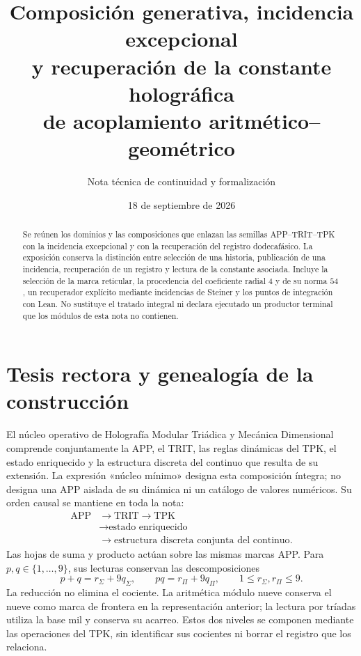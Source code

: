 \documentclass[11pt,a4paper]{article}
\title{Composición generativa, incidencia excepcional\protect\\
y recuperación de la constante holográfica\protect\\
de acoplamiento aritmético--geométrico}
\author{Nota técnica de continuidad y formalización}
\date{18 de septiembre de 2026}
\begin{document}
\maketitle

\begin{abstract}
Se reúnen los dominios y las composiciones que enlazan las semillas
APP--TRIT--TPK con la incidencia excepcional y con la recuperación del registro
dodecafásico. La exposición conserva la distinción entre selección de una
historia, publicación de una incidencia, recuperación de un registro y lectura
de la constante asociada. Incluye la selección de la marca reticular, la
procedencia del coeficiente radial $4$ y de su norma $54$, un recuperador
explícito mediante incidencias de Steiner y los puntos de integración con
Lean. No sustituye el tratado integral ni declara ejecutado un productor
terminal que los módulos de esta nota no contienen.
\end{abstract}

\section{Tesis rectora y genealogía de la construcción}

El núcleo operativo de Holografía Modular Triádica y Mecánica Dimensional
comprende conjuntamente la APP, el TRIT, las reglas dinámicas del TPK, el
estado enriquecido y la estructura discreta del continuo que resulta de su
extensión. La expresión «núcleo mínimo» designa esta composición íntegra;
no designa una APP aislada de su dinámica ni un catálogo de valores
numéricos. Su orden causal se mantiene en toda la nota:
\[
\begin{aligned}
 \mathrm{APP}&\longrightarrow\mathrm{TRIT}\longrightarrow\mathrm{TPK}\\
 &\longrightarrow\text{estado enriquecido}\\
 &\longrightarrow\text{estructura discreta conjunta del continuo}.
\end{aligned}
\]
Las hojas de suma y producto actúan sobre las mismas marcas APP. Para
$p,q\in\{1,\ldots,9\}$, sus lecturas conservan las descomposiciones
\[
 p+q=r_\Sigma+9q_\Sigma,\qquad
 pq=r_\Pi+9q_\Pi,\qquad 1\leq r_\Sigma,r_\Pi\leq9.
\]
La reducción no elimina el cociente. La aritmética módulo nueve conserva
el nueve como marca de frontera en la representación anterior; la lectura
por tríadas utiliza la base mil y conserva su acarreo. Estos dos niveles
se componen mediante las operaciones del TPK, sin identificar sus cocientes
ni borrar el registro que los relaciona.
\end{document}
